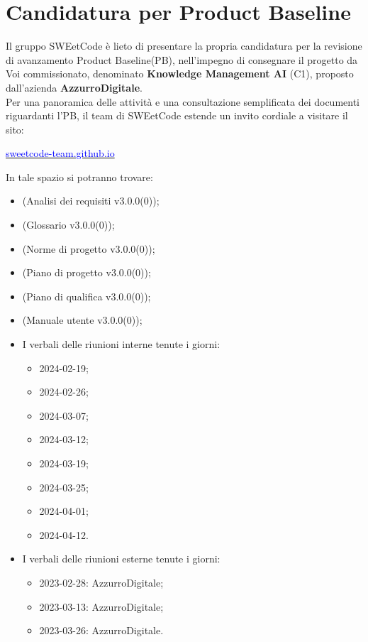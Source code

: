 \documentclass[10pt, a4paper]{article}
\title{\titolo}
\author{SWEetCode}
\begin{document}



\newpage
\section*{Candidatura per Product Baseline}
Il gruppo SWEetCode è lieto di presentare la propria candidatura per la revisione di avanzamento Product Baseline(PB), nell'impegno di consegnare il progetto da Voi commissionato, denominato \textbf{Knowledge Management AI} (C1), proposto dall'azienda \textbf{AzzurroDigitale}.\\

Per una panoramica delle attività e una consultazione semplificata dei documenti riguardanti l'PB, il team di SWEetCode estende un invito cordiale a visitare il sito:
\begin{center}
\href{https://sweetcode-team.github.io}{\textcolor{blue}{sweetcode-team.github.io}}
\end{center}

\vspace{1em}
In tale spazio si potranno trovare:
\begin{itemize}
    \item (Analisi dei requisiti v3.0.0(0));
    \item (Glossario v3.0.0(0));
    \item (Norme di progetto v3.0.0(0));
    \item (Piano di progetto v3.0.0(0));
    \item (Piano di qualifica v3.0.0(0));
    \item (Manuale utente v3.0.0(0));
    \item I verbali delle riunioni interne tenute i giorni:
        \begin{itemize}
            \item 2024-02-19;
            \item 2024-02-26;
            \item 2024-03-07;
            \item 2024-03-12;
            \item 2024-03-19;
            \item 2024-03-25;
            \item 2024-04-01;
            \item 2024-04-12.
        \end{itemize}
   \item I verbali delle riunioni esterne tenute i giorni:
        \begin{itemize}
            \item 2023-02-28: AzzurroDigitale;
            \item 2023-03-13: AzzurroDigitale;
            \item 2023-03-26: AzzurroDigitale.
        \end{itemize}    
\end{itemize}
\end{document}
